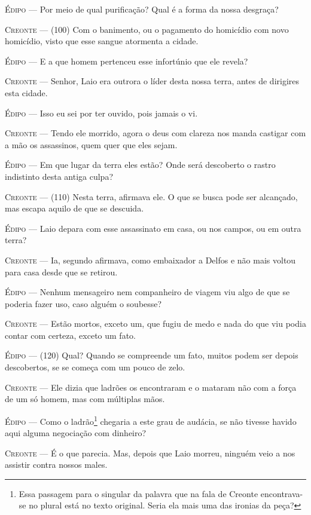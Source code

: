 \textsc{Édipo} --- Por meio de qual purificação? Qual é a forma da nossa desgraça?

\textsc{Creonte} --- (100) Com o banimento, ou o pagamento do homicídio com novo homicídio,
visto que esse sangue atormenta a cidade.

\textsc{Édipo} --- E a que homem pertenceu esse infortúnio que ele revela?

\textsc{Creonte} --- Senhor, Laio era outrora o líder desta nossa terra, antes de dirigires
esta cidade.

\textsc{Édipo} --- Isso eu sei por ter ouvido, pois jamais o vi.

\textsc{Creonte} --- Tendo ele morrido, agora o deus com clareza nos manda castigar com a mão
os assassinos, quem quer que eles sejam.

\textsc{Édipo} --- Em que lugar da terra eles estão? Onde será descoberto o rastro
indistinto desta antiga culpa?

\textsc{Creonte} --- (110) Nesta terra, afirmava ele. O que se busca pode ser alcançado, mas
escapa aquilo de que se descuida.

\textsc{Édipo} --- Laio depara com esse assassinato em casa, ou nos campos, ou em outra
terra?

\textsc{Creonte} --- Ia, segundo afirmava, como embaixador a Delfos e não mais voltou para
casa desde que se retirou.

\textsc{Édipo} --- Nenhum mensageiro nem companheiro de viagem viu algo de que se poderia
fazer uso, caso alguém o soubesse?

\textsc{Creonte} --- Estão mortos, exceto um, que fugiu de medo e nada do que viu podia
contar com certeza, exceto um fato.

\textsc{Édipo} --- (120) Qual? Quando se compreende um fato, muitos podem ser depois
descobertos, se se começa com um pouco de zelo.

\textsc{Creonte} --- Ele dizia que ladrões os encontraram e o mataram não com a força de um
só homem, mas com múltiplas mãos.

\textsc{Édipo} --- Como o ladrão\footnote{Essa passagem para o singular da palavra que na
  fala de Creonte encontrava-se no plural está no texto original. Seria
  ela mais uma das ironias da peça?} chegaria a este grau de audácia, se
não tivesse havido aqui alguma negociação com dinheiro?

\textsc{Creonte} --- É o que parecia. Mas, depois que Laio morreu, ninguém veio a nos
assistir contra nossos males.


